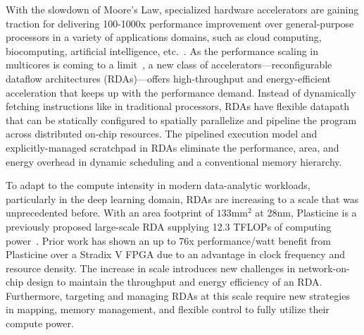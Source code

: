
With the slowdown of Moore’s Law, specialized hardware accelerators are gaining traction for delivering 100-1000x performance improvement over general-purpose processors in a variety of applications domains, such as cloud computing, biocomputing, 
artificial intelligence, etc.~\cite{fpgacloudsurvey,bioaccel,genomicaccel}.
As the performance scaling in multicores is coming to a limit~\cite{multicorescale}, a new class of
accelerators---reconfigurable dataflow architectures (RDAs)---offers high-throughput and energy-efficient acceleration that keeps up with the performance demand.
Instead of dynamically fetching instructions like in traditional processors, RDAs have flexible datapath  that can be statically configured to spatially parallelize and pipeline the program across
distributed on-chip resources. 
The pipelined execution model and explicitly-managed scratchpad in RDAs eliminate the performance, area, and energy overhead in dynamic scheduling and a conventional memory hierarchy.

To adapt to the compute intensity in modern data-analytic workloads, particularly in the deep learning domain, RDAs are increasing to a scale that was unprecedented before.
With an area footprint of $133\text{mm}^2$ at 28nm, 
Plasticine is a previously proposed large-scale RDA supplying 12.3 TFLOPs of computing power~\cite{plasticine}.
Prior work has shown an up to 76x performance/watt benefit from Plasticine over a Stradix V FPGA 
due to an advantage in clock frequency and resource density.
The increase in scale introduces new challenges in network-on-chip design to maintain 
the throughput and energy efficiency of an RDA.
Furthermore, targeting and managing RDAs at this scale require new strategies in mapping,  memory management, and flexible control to fully utilize their compute power. 

